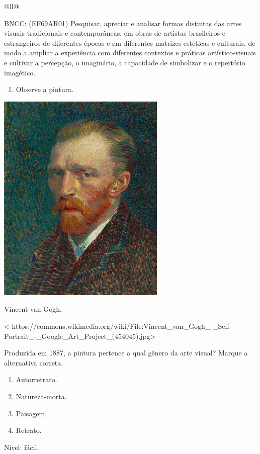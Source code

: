 \begin{itemize}
\begin{itemize}
\begin{escolha}[]{@{}ll@{}}
{{{{{{{{BNCC: (EF69AR01) Pesquisar, apreciar e analisar formas distintas das
artes visuais tradicionais e contemporâneas, em obras de artistas
brasileiros e estrangeiros de diferentes épocas e em diferentes matrizes
estéticas e culturais, de modo a ampliar a experiência com diferentes
contextos e práticas artístico-visuais e cultivar a percepção, o
imaginário, a capacidade de simbolizar e o repertório imagético.

\begin{enumerate}
\def\labelenumi{\arabic{enumi}.}
\item
  Observe a pintura.
\end{enumerate}

\includegraphics[width=3.16667in,height=4.01042in]{media/image28.png}

Vincent van Gogh.

\textless{}
https://commons.wikimedia.org/wiki/File:Vincent\_van\_Gogh\_-\_Self-Portrait\_-\_Google\_Art\_Project\_(454045).jpg\textgreater{}

Produzida em 1887, a pintura pertence a qual gênero da arte visual?
Marque a alternativa correta.

\begin{enumerate}
\def\labelenumi{\alph{enumi})}
\item
  Autorretrato.
\item
  Natureza-morta.
\item
  Paisagem.
\item
  Retrato.
\end{enumerate}

Nível: fácil.

}}}}}}}}
\end{escolha}
\end{itemize}
\end{itemize}

